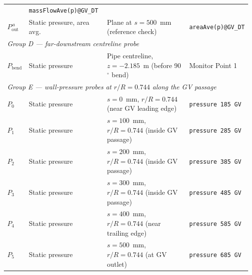 \begin{table}[H]
\begin{tabular}{llll}
                   & \verb|massFlowAve(p)@GV_DT| \\
$P_{\mathrm{out}}^{\,a}$ & Static pressure, area avg.
                   & Plane at $s = 500$~mm (reference check)
                   & \verb|areaAve(p)@GV_DT| \\[0.4em]
\multicolumn{4}{l}{\textit{Group D — far-downstream centreline probe}} \\
$P_{\mathrm{bend}}$ & Static pressure & Pipe centreline, $z = -2.185$~m
                                      (before 90$^\circ$ bend)
                   & Monitor Point 1 \\[0.4em]
\multicolumn{4}{l}{\textit{Group E — wall-pressure probes at $r/R = 0.744$ along the GV passage}} \\
$P_0$ & Static pressure & $s = 0$~mm,   $r/R = 0.744$ (near GV leading edge) & \verb|pressure 185 GV| \\
$P_1$ & Static pressure & $s = 100$~mm, $r/R = 0.744$ (inside GV passage)    & \verb|pressure 285 GV| \\
$P_2$ & Static pressure & $s = 200$~mm, $r/R = 0.744$ (inside GV passage)    & \verb|pressure 385 GV| \\
$P_3$ & Static pressure & $s = 300$~mm, $r/R = 0.744$ (inside GV passage)    & \verb|pressure 485 GV| \\
$P_4$ & Static pressure & $s = 400$~mm, $r/R = 0.744$ (near trailing edge)   & \verb|pressure 585 GV| \\
$P_5$ & Static pressure & $s = 500$~mm, $r/R = 0.744$ (at GV outlet)         & \verb|pressure 685 GV| \\ \hline
\end{tabular}
\end{table}
 
